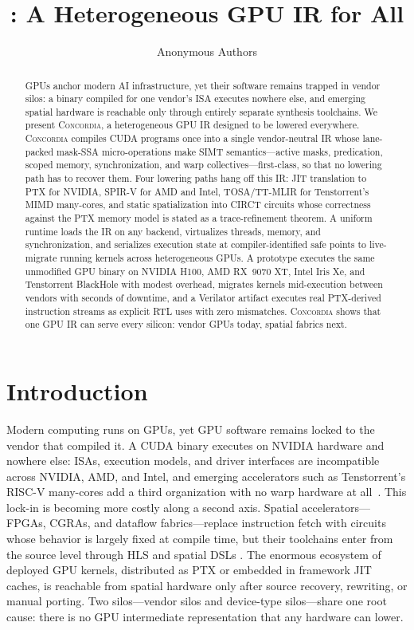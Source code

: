 \documentclass[sigplan,nonacm]{acmart}
\title{\sys: A Heterogeneous GPU IR for All}
\author{Anonymous Authors}
\newcommand{\sys}{\textsc{Concordia}\xspace}
\newcommand{\circt}{CIRCT\xspace}
\begin{document}
\begin{abstract}
GPUs anchor modern AI infrastructure, yet their software remains trapped in
vendor silos: a binary compiled for one vendor's ISA executes nowhere else,
and emerging spatial hardware is reachable only through entirely separate
synthesis toolchains.  We present \sys, a heterogeneous GPU IR designed to be
lowered everywhere.  \sys compiles CUDA programs once into a single
vendor-neutral IR whose lane-packed mask-SSA micro-operations make SIMT
semantics---active masks, predication, scoped memory, synchronization, and
warp collectives---first-class, so that no lowering path has to recover them.
Four lowering paths hang off this IR: JIT translation to PTX for NVIDIA,
SPIR-V for AMD and Intel, TOSA/TT-MLIR for Tenstorrent's MIMD many-cores, and
static spatialization into \circt circuits whose correctness against the PTX
memory model is stated as a trace-refinement theorem.  A uniform runtime loads
the IR on any backend, virtualizes threads, memory, and synchronization, and
serializes execution state at compiler-identified safe points to live-migrate
running kernels across heterogeneous GPUs.  A prototype executes the same
unmodified GPU binary on NVIDIA H100, AMD RX~9070 XT, Intel Iris Xe, and
Tenstorrent BlackHole with modest overhead, migrates kernels mid-execution
between vendors with seconds of downtime, and a Verilator artifact executes
real PTX-derived instruction streams as explicit RTL uses with zero
mismatches.  \sys shows that one GPU IR can serve every silicon: vendor GPUs
today, spatial fabrics next.
\end{abstract}

\maketitle

\section{Introduction}
\label{sec:intro}

Modern computing runs on GPUs, yet GPU software remains locked to the vendor
that compiled it.  A CUDA binary executes on NVIDIA hardware and nowhere
else: ISAs, execution models, and driver interfaces are incompatible across
NVIDIA, AMD, and Intel, and emerging accelerators such as Tenstorrent's
RISC-V many-cores add a third organization with no warp hardware at
all~\cite{lustig2019ptx,chen2018tvm,lattner2021mlir}.  This lock-in is
becoming more costly along a second axis.  Spatial accelerators---FPGAs,
CGRAs, and dataflow fabrics---replace instruction fetch with circuits whose
behavior is largely fixed at compile time, but their toolchains enter from
the source level through HLS and spatial DSLs
\cite{koeplinger2018spatial,prabhakar2017plasticine,ye2021scalehls}.  The
enormous ecosystem of deployed GPU kernels, distributed as PTX or embedded in
framework JIT caches, is reachable from spatial hardware only after source
recovery, rewriting, or manual porting.  Two silos---vendor silos and
device-type silos---share one root cause: there is no GPU intermediate
representation that any hardware can lower.
\end{document}
